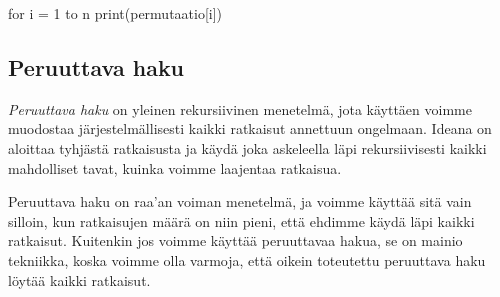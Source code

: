 \begin{code}
for i = 1 to n
    print(permutaatio[i])
\end{code}

\subsection{Peruuttava haku}

\emph{Peruuttava haku} on yleinen rekursiivinen menetelmä,
jota käyttäen voimme muodostaa järjestelmällisesti
kaikki ratkaisut annettuun ongelmaan.
Ideana on aloittaa tyhjästä ratkaisusta ja käydä
joka askeleella läpi rekursiivisesti kaikki mahdolliset tavat,
kuinka voimme laajentaa ratkaisua.

Peruuttava haku on raa'an voiman menetelmä,
ja voimme käyttää sitä vain silloin,
kun ratkaisujen määrä on niin pieni,
että ehdimme käydä läpi kaikki ratkaisut.
Kuitenkin jos voimme käyttää peruuttavaa hakua,
se on mainio tekniikka,
koska voimme olla varmoja, että oikein toteutettu
peruuttava haku löytää kaikki ratkaisut.

